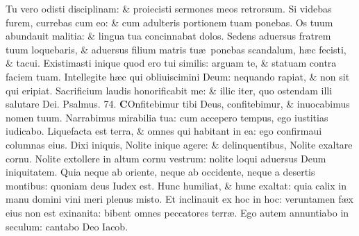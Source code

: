 \documentclass[a5paper,10pt]{book}
\def\ae{æ}
\begin{document}
\begin{multicols*}{2}
\newline \color{red} T\color{black}u vero odisti disciplinam: \& proiecisti sermones meos retrorsum.
\newline \color{red} S\color{black}i videbas furem, currebas cum eo: \& cum adulteris portionem tuam ponebas.
\newline \color{red} O\color{black}s tuum abundauit malitia: \& lingua tua concinnabat dolos.
\newline \color{red} S\color{black}edens aduersus fratrem tuum loquebaris, \& aduersus filium matris tu\ae \ ponebas scandalum, h\ae c fecisti, \& tacui.
\newline \color{red} E\color{black}xistimasti inique quod ero tui similis: arguam te, \& statuam contra faciem tuam.
\newline \color{red} I\color{black}ntellegite h\ae c qui obliuiscimini Deum: nequando rapiat, \& non sit qui eripiat.
\newline \color{red} S\color{black}acrificium laudis honorificabit me: \& illic iter, quo ostendam illi salutare Dei.
\newline \color{red} Psalmus. \hypertarget{ps74}{74.} \color{black}
\vspace{-.5em}
\lettrine[lines=2]{\bfseries \color{red} C}{}Onfitebimur tibi Deus, confitebimur, \& inuocabimus nomen tuum.
\newline \color{red} N\color{black}arrabimus mirabilia tua: cum accepero tempus, ego iustitias iudicabo.
\newline \color{red} L\color{black}iquefacta est terra, \& omnes qui habitant in ea: ego confirmaui columnas eius.
\newline \color{red} D\color{black}ixi iniquis, Nolite inique agere: \& delinquentibus, Nolite exaltare cornu.
\newline \color{red} N\color{black}olite extollere in altum cornu vestrum: nolite loqui aduersus Deum iniquitatem.
\newline \color{red} Q\color{black}uia neque ab oriente, neque ab occidente, neque a desertis montibus: quoniam deus Iudex est.
\newline \color{red} H\color{black}unc humiliat, \& hunc exaltat: quia calix in manu domini vini meri plenus misto.
\newline \color{red} E\color{black}t inclinauit ex hoc in hoc: veruntamen f\ae x eius non est exinanita: bibent omnes peccatores terr\ae .
\newline \color{red} E\color{black}go autem annuntiabo in seculum: cantabo Deo Iacob.

\end{multicols*}
\end{document}

